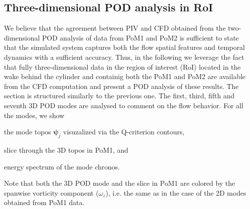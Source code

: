 {\subsection{Three-dimensional POD analysis in RoI}
\label{sub:3DPOD}
{We believe that the agreement between PIV and CFD obtained from the two-dimensional POD analysis of data from PoM1 and PoM2 is sufficient to state that the simulated system captures both the flow spatial features and temporal dynamics with a sufficient accuracy. Thus, in the following we leverage the fact that fully three-dimensional data in the region of interest (RoI) located in the wake behind the cylinder and containig both the PoM1 and PoM2 are available from the CFD computation and present a POD analysis of these results. The section is structured similarly to the previous one. The first, third, fifth and seventh 3D POD modes are analysed to comment on the flow behavior. For all the modes, we show 
\begin{inparaenum}[(a)]
 \item the mode topos $\bm{\psi}_{j}$ visuzalized via the Q-criterion contours,
 \item slice through the 3D topos in PoM1, and
 \item energy spectrum of the mode chronos.
\end{inparaenum}
Note that both the 3D POD mode and the slice in PoM1 are colored by the spanwise vorticity component {($\omega_z$)}, {i.e. the} same as in the case of the 2D modes obtained from PoM1 data.
}

}
